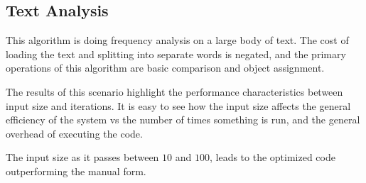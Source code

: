 \subsection{Text Analysis}
This algorithm is doing frequency analysis on a large body of text.  The cost of loading the text and splitting into separate words is negated, and the primary operations of this algorithm are basic comparison and object assignment. 

The results of this scenario highlight the performance characteristics between input size and iterations.  It is easy to see how the input size affects the general efficiency of the system vs the number of times something is run, and the general overhead of executing the code.

The input size as it passes between $10$ and $100$, leads to the optimized code outperforming the manual form. 